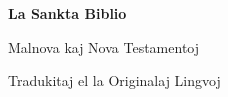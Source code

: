 \titlecontent
\begin{center}
\vspace*{\fill}
{\Huge\bfseries La Sankta Biblio}\par\bigskip
{\large Malnova kaj Nova Testamentoj\par
Tradukitaj el la Originalaj Lingvoj}
\vspace*{\fill}
\end{center}
\clearpage
\tableofcontents
\clearpage
